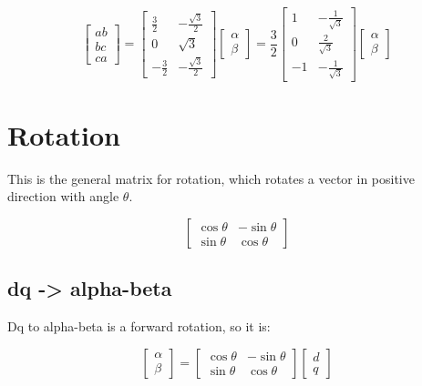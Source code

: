 \documentclass[]{book}
\begin{document}
\[
\begin{bmatrix} ab\\ bc \\ ca \end{bmatrix}
= \begin{bmatrix} \frac{3}{2} & -\frac{\sqrt{3}}{2} \\  0 & \sqrt{3} \\ 
-\frac{3}{2} & -\frac{\sqrt{3}}{2} \end{bmatrix}
\begin{bmatrix} \alpha\\ \beta \end{bmatrix}
= \frac{3}{2} \begin{bmatrix} 1 & -\frac{1}{\sqrt{3}} \\  0 & \frac{2}{\sqrt{3}} \\ 
-1 & -\frac{1}{\sqrt{3}} \end{bmatrix}
\begin{bmatrix} \alpha\\ \beta \end{bmatrix}
\label{eq:abcABmat2}
\]

\hypertarget{rotation}{%
\section{Rotation}\label{rotation}}

This is the general matrix for rotation, which rotates a vector in positive direction with angle \(\theta\).

\[
\begin{bmatrix} \cos\theta & -\sin\theta \\  \sin\theta & \cos\theta  \end{bmatrix}
\label{eq:transRot}
\]

\hypertarget{dq---alpha-beta}{%
\subsection{dq -\textgreater{} alpha-beta}\label{dq---alpha-beta}}

Dq to alpha-beta is a forward rotation, so it is:

\[
\begin{bmatrix} \alpha \\  \beta  \end{bmatrix} =
\begin{bmatrix} \cos\theta & -\sin\theta \\  \sin\theta & \cos\theta  \end{bmatrix}
\begin{bmatrix} d \\  q  \end{bmatrix}
\label{eq:transAbDq}
\]
\end{document}

